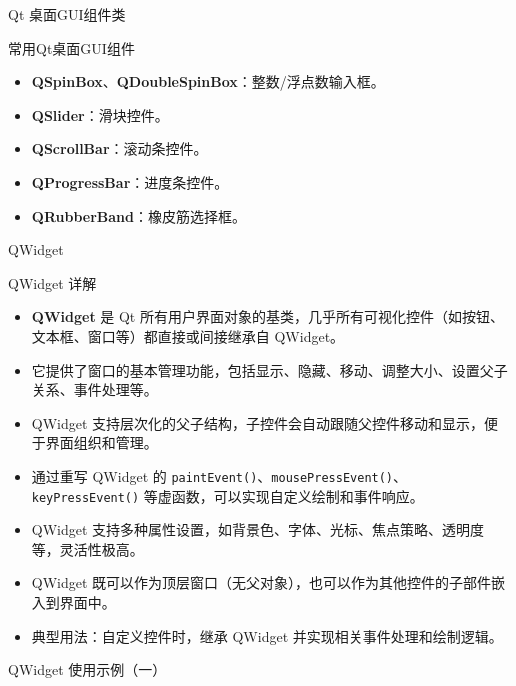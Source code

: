 \documentclass[UTF8,aspectratio=169]{beamer}
\begin{document}
\begin{frame}{Qt 桌面GUI组件类}
\begin{ytublock}{常用Qt桌面GUI组件}
{\begin{multicols}{2}
\begin{itemize}
            \item \textbf{QSpinBox}、\textbf{QDoubleSpinBox}：整数/浮点数输入框。
            \item \textbf{QSlider}：滑块控件。
            \item \textbf{QScrollBar}：滚动条控件。
            \item \textbf{QProgressBar}：进度条控件。
            \item \textbf{QRubberBand}：橡皮筋选择框。
        \end{itemize}
        \end{multicols}
        }
    \end{ytublock}
\end{frame}

\begin{frame}{QWidget}
    \begin{ytublock}{QWidget 详解}
        \begin{itemize}
            \item \textbf{QWidget} 是 Qt 所有用户界面对象的基类，几乎所有可视化控件（如按钮、文本框、窗口等）都直接或间接继承自 QWidget。
            \item 它提供了窗口的基本管理功能，包括显示、隐藏、移动、调整大小、设置父子关系、事件处理等。
            \item QWidget 支持层次化的父子结构，子控件会自动跟随父控件移动和显示，便于界面组织和管理。
            \item 通过重写 QWidget 的 \texttt{paintEvent()}、\texttt{mousePressEvent()}、\texttt{keyPressEvent()} 等虚函数，可以实现自定义绘制和事件响应。
            \item QWidget 支持多种属性设置，如背景色、字体、光标、焦点策略、透明度等，灵活性极高。
            \item QWidget 既可以作为顶层窗口（无父对象），也可以作为其他控件的子部件嵌入到界面中。
            \item 典型用法：自定义控件时，继承 QWidget 并实现相关事件处理和绘制逻辑。
        \end{itemize}
    \end{ytublock}
\end{frame}

\begin{frame}[fragile]{QWidget 使用示例（一）  }
    \begin{columns}
        \begin{column}{0.48\textwidth}
            \inputminted[firstline=1,lastline=16]{cpp}{code/qt_widget_example.cpp}
        \end{column}
        \begin{column}{0.48\textwidth}
            \inputminted[firstline=17,lastline=31]{cpp}{code/qt_widget_example.cpp}
        \end{column}
    \end{columns}
\end{frame}
\end{document}
